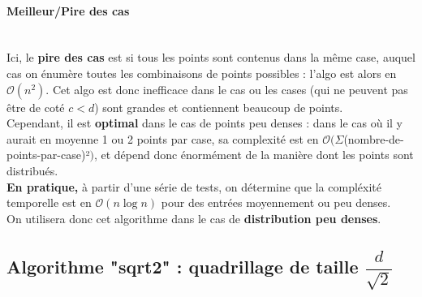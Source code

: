 \documentclass[a4paper,11pt]{article}
\begin{document}
\paragraph{Meilleur/Pire des cas} \mbox{} \\
Ici, le \textbf{pire des cas} est si tous les points sont contenus dans la même case, auquel cas on énumère toutes les combinaisons de points possibles : l'algo est alors en $\mathcal{O}(n^2)$. Cet algo est donc inefficace dans le cas ou les cases (qui ne peuvent pas être de coté $c < d$) sont grandes et contiennent beaucoup de points.\\
Cependant, il est \textbf{optimal} dans le cas de points peu denses : dans le cas où il y aurait en moyenne 1 ou 2 points par case, sa complexité est en $\mathcal{O}(\Sigma$(nombre-de-points-par-case)²$)$, et dépend donc énormément de la manière dont les points sont distribués.   \\
\textbf{En pratique,} à partir d'une série de tests, on détermine que la compléxité temporelle est en $\mathcal{O}(n\log n)$ pour des entrées moyennement ou peu denses.\\
On utilisera donc cet algorithme dans le cas de \textbf{distribution peu denses}.

\subsection{Algorithme "sqrt2" : quadrillage de taille $\dfrac{d}{\sqrt{2}}$}
\end{document}
